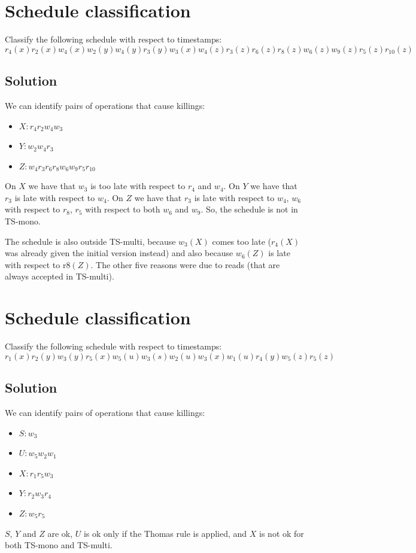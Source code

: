 \documentclass[12pt, a4paper]{report}
\newtheorem[style=M,bodystyle=\normalfont]{theorem}{Theorem}
\newtheorem[style=M,bodystyle=\normalfont]{corollary}{Corollary}
\newtheorem[style=M,bodystyle=\normalfont]{lemma}{Lemma}
\newtheorem[style=M,bodystyle=\normalfont]{definition}{Definition}
\begin{document}
    \section{Schedule classification}
        Classify the following schedule with respect to timestamps: 
        \[r_4(x) r_2(x) w_4(x) w_2(y) w_4(y) r_3(y) w_3(x) w_4(z) r_3(z) r_6(z) r_8(z) w_6(z) w_9(z) r_5(z) r_{10}(z)\]
    \subsection*{Solution}
        We can identify pairs of operations that cause killings:
        \begin{itemize}
            \item $X: r_4 r_2 w_4 w_3$
            \item $Y: w_2 w_4 r_3$
            \item $Z: w_4 r_3 r_6 r_8 w_6 w_9 r_5 r_{10}$
        \end{itemize}
        On $X$ we have that $w_3$ is too late with respect to $r_4$ and $w_4$. On $Y$ we have that $r_3$ is late with respect to $w_4$. On 
        $Z$ we have that $r_3$ is late with respect to $w_4$, $w_6$ with respect to $r_8$, $r_5$ with respect to both $w_6$ and $w_9$. 
        So, the schedule is not in TS-mono. 

        The schedule is also outside TS-multi, because $w_3(X)$ comes too late ($r_4(X)$ was already given the initial version instead) and 
        also because $w_6(Z)$ is late with respect to r$8(Z)$. The other five reasons were due to reads (that are always accepted in TS-multi).

    \newpage

    \section{Schedule classification}
        Classify the following schedule with respect to timestamps: 
        \[r_1(x) r_2(y) w_3(y) r_5(x) w_5(u) w_3(s) w_2(u) w_3(x) w_1(u) r_4(y) w_5(z) r_5(z)\]
    \subsection*{Solution}
        We can identify pairs of operations that cause killings:
        \begin{itemize}
            \item $S:w_3$
            \item $U:w_5w_2w_1$
            \item $X:r_1r_5w_3$
            \item $Y:r_2w_3r_4$
            \item $Z:w_5r_5$
        \end{itemize}
        $S$, $Y$ and $Z$ are ok, $U$ is ok only if the Thomas rule is applied, and $X$ is not ok for both TS-mono and TS-multi. 
\end{document}

